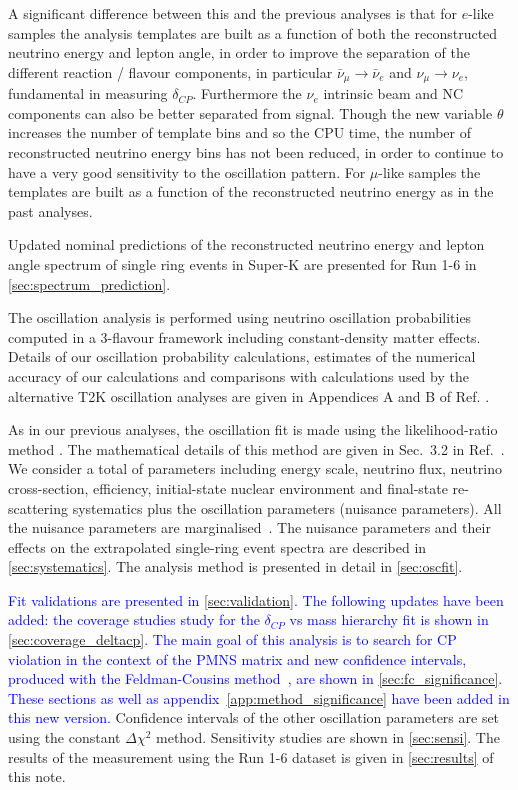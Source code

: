 A significant difference between this and the previous analyses is that
for $e$-like samples the analysis templates are built as a function of both 
the reconstructed neutrino energy and lepton angle,
in order to improve the separation of the different reaction / flavour components,
in particular $\bar{\nu}_{\mu} \rightarrow \bar{\nu}_e$ and $\nu_{\mu} \rightarrow \nu_e$,
fundamental in measuring $\delta_{CP}$.
Furthermore the $\nu_e$ intrinsic beam and NC components can also be better separated from signal.
Though the new variable $\theta$ increases the number of template bins and so the CPU time,
the number of reconstructed neutrino energy bins has not been reduced,
in order to continue to have a very good sensitivity to the oscillation pattern.
For $\mu$-like samples the templates are built as a function of the reconstructed neutrino energy
as in the past analyses.




Updated nominal predictions of the reconstructed neutrino energy and lepton angle spectrum 
of single ring events in Super-K are presented 
for Run 1-6 in \cref{sec:spectrum_prediction}.

The oscillation analysis is performed using neutrino oscillation probabilities computed in a 3-flavour
framework including constant-density matter effects. 
Details of our oscillation probability calculations, estimates of the numerical accuracy of our
calculations and comparisons with calculations used by the alternative T2K oscillation analyses 
are given in Appendices A and B of Ref. \cite{OurRun123DisappAnalysis3Flavour}.

As in our previous analyses, the oscillation fit is made using the likelihood-ratio method \cite{StatAnalysisCowan}.
The mathematical details of this method are given in Sec.\ 3.2 in Ref.\ \cite{OurRun1DisappAnalysis}.
We consider a total of \NSyst{} parameters including energy scale, neutrino flux, neutrino cross-section,
efficiency, initial-state nuclear environment and final-state re-scattering systematics 
plus the oscillation parameters (nuisance parameters).
All the nuisance parameters are marginalised~\cite{CousinsHighland}.
The nuisance parameters and their effects 
on the extrapolated single-ring event spectra are described in \cref{sec:systematics}.
The analysis method is presented in detail in \cref{sec:oscfit}.

\textcolor{blue}{
Fit validations are presented in \cref{sec:validation}. 
The following updates have been added: 
the coverage studies study for the $\delta_{CP}$ vs mass hierarchy fit is shown in \cref{sec:coverage_deltacp}.
The main goal of this analysis is to search for CP violation in the context of the PMNS matrix
and new confidence intervals, produced with the Feldman-Cousins method~\cite{FeldmanCousins},
are shown in \cref{sec:fc_significance}.
These sections as well as appendix~\ref{app:method_significance} have been added in this new version.  
}
Confidence intervals of the other oscillation parameters are set using the 
constant $\Delta \chi^2$ method.
Sensitivity studies are shown in \cref{sec:sensi}.
The results of the measurement using the Run 1-6 dataset is given in \cref{sec:results} of this note. 

